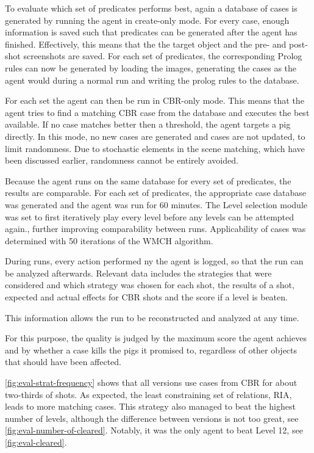 To evaluate which set of predicates performs best, again a database of cases is generated by running the agent in create-only mode.
For every case, enough information is saved such that predicates can be generated after the agent has finished. Effectively, this means that the the target object and the pre- and post-shot screenshots are saved. For each set of predicates, the corresponding Prolog rules can now be generated by loading the images, generating the cases as the agent would during a normal run and writing the prolog rules to the database.

For each set the agent can then be run in CBR-only mode. This means that the agent tries to find a matching CBR case from the database and executes the best available. If no case matches better then a threshold, the agent targets a pig directly. In this mode, no new cases are generated and cases are not updated, to limit randomness. Due to stochastic elements in the scene matching, which have been discussed earlier, randomness cannot be entirely avoided.

Because the agent runs on the same database for every set of predicates, the results are comparable. For each set of predicates, the appropriate case database was generated and the agent was run for 60 minutes. The Level selection module was set to first iteratively play every level before any levels can be attempted again., further improving comparability between runs.
Applicability of cases was determined with 50 iterations of the \ac{WMCH} algorithm.

During runs, every action performed ny the agent is logged, so that the run can be analyzed afterwards. Relevant data includes the strategies that were considered and which strategy was chosen for each shot, the results of a shot, expected and actual effects for CBR shots and the score if a level is beaten.

This information allows the run to be reconstructed and analyzed at any time.


For this purpose, the quality is judged by the maximum score the agent achieves and by whether a case kills the pigs it promised to, regardless of other objects that should have been affected.

\ref{fig:eval-strat-frequency} shows that all versions use cases from \ac{CBR} for about two-thirds of shots. As expected, the least constraining set of relations, \ac{RIA}, leads to more matching cases. This strategy also managed to beat the highest number of levels, although the difference between versions is not too great, see \ref{fig:eval-number-of-cleared}. Notably, it was the only agent to beat Level 12, see \ref{fig:eval-cleared}.

